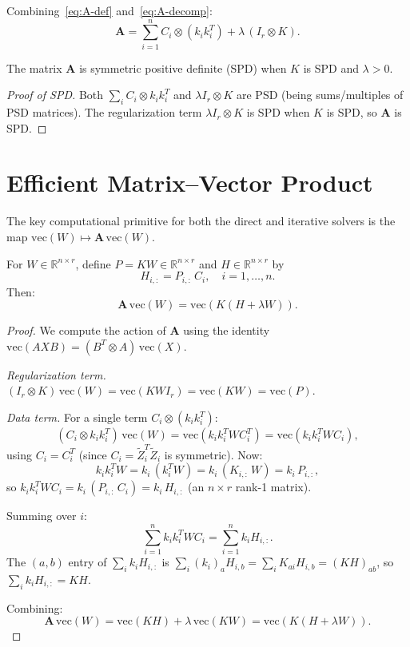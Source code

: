 \documentclass[12pt]{article}
\theoremstyle{definition}
\begin{document}
Combining~\eqref{eq:A-def} and~\eqref{eq:A-decomp}:
\begin{equation}\label{eq:A-reform}
\mathbf{A} = \sum_{i=1}^n C_i \otimes (k_i k_i^T) + \lambda\,(I_r \otimes K).
\end{equation}

The matrix $\mathbf{A}$ is symmetric positive definite (SPD) when $K$ is SPD and $\lambda > 0$.

\begin{proof}[Proof of SPD]
Both $\sum_i C_i \otimes k_ik_i^T$ and $\lambda I_r \otimes K$ are PSD (being sums/multiples of PSD matrices). The regularization term $\lambda I_r \otimes K$ is SPD when $K$ is SPD, so $\mathbf{A}$ is SPD.
\end{proof}

\section{Efficient Matrix--Vector Product}\label{sec:matvec}

The key computational primitive for both the direct and iterative solvers is the map $\mathrm{vec}(W) \mapsto \mathbf{A}\,\mathrm{vec}(W)$.

\begin{proposition}\label{prop:matvec}
For $W \in \mathbb{R}^{n \times r}$, define $P = KW \in \mathbb{R}^{n \times r}$ and $H \in \mathbb{R}^{n \times r}$ by
\[
H_{i,:} = P_{i,:}\,C_i, \quad i = 1, \dots, n.
\]
Then:
\begin{equation}\label{eq:matvec}
\mathbf{A}\,\mathrm{vec}(W) = \mathrm{vec}\!\left(K(H + \lambda W)\right).
\end{equation}
\end{proposition}

\begin{proof}
We compute the action of $\mathbf{A}$ using the identity $\mathrm{vec}(AXB) = (B^T \otimes A)\,\mathrm{vec}(X)$.

\textit{Regularization term.} $(I_r \otimes K)\,\mathrm{vec}(W) = \mathrm{vec}(KWI_r) = \mathrm{vec}(KW) = \mathrm{vec}(P)$.

\textit{Data term.} For a single term $C_i \otimes (k_ik_i^T)$:
\[
(C_i \otimes k_ik_i^T)\,\mathrm{vec}(W) = \mathrm{vec}(k_ik_i^T W C_i^T) = \mathrm{vec}(k_ik_i^T W C_i),
\]
using $C_i = C_i^T$ (since $C_i = \tilde{Z}_i^T\tilde{Z}_i$ is symmetric). Now:
\[
k_ik_i^T W = k_i\,(k_i^T W) = k_i\,(K_{i,:}\,W) = k_i\,P_{i,:},
\]
so $k_ik_i^T W C_i = k_i\,(P_{i,:}\,C_i) = k_i\,H_{i,:}$ (an $n \times r$ rank-1 matrix).

Summing over $i$:
\[
\sum_{i=1}^n k_ik_i^T W C_i = \sum_{i=1}^n k_i H_{i,:}.
\]
The $(a,b)$ entry of $\sum_i k_i H_{i,:}$ is $\sum_i (k_i)_a H_{i,b} = \sum_i K_{ai} H_{i,b} = (KH)_{ab}$, so $\sum_i k_iH_{i,:} = KH$.

Combining:
\[
\mathbf{A}\,\mathrm{vec}(W) = \mathrm{vec}(KH) + \lambda\,\mathrm{vec}(KW) = \mathrm{vec}(K(H + \lambda W)).
\]
\end{proof}
\end{document}
